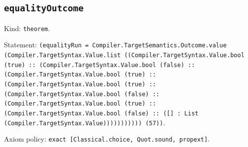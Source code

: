 \documentclass[11pt]{article}
\begin{document}
\subsection*{\texttt{equalityOutcome}}
\noindent Kind: \texttt{theorem}.\par
\noindent Statement: \texttt{(equalityRun = Compiler.TargetSemantics.Outcome.value (Compiler.TargetSyntax.Value.list ((Compiler.TargetSyntax.Value.bool (true) :: (Compiler.TargetSyntax.Value.bool (false) :: (Compiler.TargetSyntax.Value.bool (true) :: (Compiler.TargetSyntax.Value.bool (true) :: (Compiler.TargetSyntax.Value.bool (false) :: (Compiler.TargetSyntax.Value.bool (true) :: (Compiler.TargetSyntax.Value.bool (false) :: ([] : List (Compiler.TargetSyntax.Value))))))))))) (57))}.\par
\noindent Axiom policy: \texttt{exact [Classical.choice, Quot.sound, propext]}.\par
\end{document}

